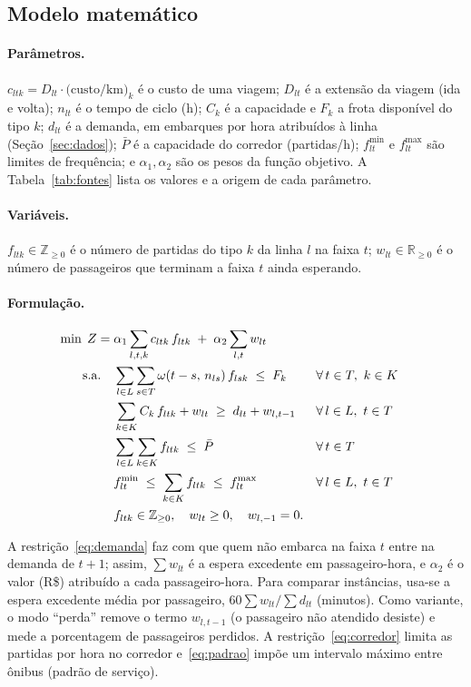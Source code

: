 \documentclass[11pt,a4paper]{article}
\newcommand{\R}{\mathbb{R}}
\begin{document}
\subsection{Modelo matemático}

\paragraph{Parâmetros.}
$c_{ltk}=D_{lt}\cdot\text{(custo/km)}_k$ é o custo de uma viagem; $D_{lt}$ é a
extensão da viagem (ida e volta); $n_{lt}$ é o tempo de ciclo (h); $C_k$ é a
capacidade e $F_k$ a frota disponível do tipo $k$; $d_{lt}$ é a demanda, em
embarques por hora atribuídos à linha (Seção~\ref{sec:dados}); $\bar{P}$ é a
capacidade do corredor (partidas/h); $f^{\min}_{lt}$ e $f^{\max}_{lt}$ são
limites de frequência; e $\alpha_1,\alpha_2$ são os pesos da função objetivo. A
Tabela~\ref{tab:fontes} lista os valores e a origem de cada parâmetro.

\paragraph{Variáveis.}
$f_{ltk}\in\mathbb{Z}_{\ge 0}$ é o número de partidas do tipo $k$ da linha $l$ na
faixa $t$; $w_{lt}\in\R_{\ge 0}$ é o número de passageiros que terminam a faixa
$t$ ainda esperando.

\paragraph{Formulação.}
\begin{align}
\min\; Z = {} & \alpha_1 \sum_{l,t,k} c_{ltk}\, f_{ltk} \;+\; \alpha_2 \sum_{l,t} w_{lt} \label{eq:fo}\\
\text{s.a.}\quad
& \sum_{l\in L}\sum_{s\in T} \omega\!\left(t-s,\, n_{ls}\right) f_{lsk} \;\le\; F_k
  && \forall\, t\in T,\ k\in K \label{eq:frota}\\
& \sum_{k\in K} C_k\, f_{ltk} + w_{lt} \;\ge\; d_{lt} + w_{l,t-1}
  && \forall\, l\in L,\ t\in T \label{eq:demanda}\\
& \sum_{l\in L}\sum_{k\in K} f_{ltk} \;\le\; \bar{P}
  && \forall\, t\in T \label{eq:corredor}\\
& f^{\min}_{lt} \;\le\; \sum_{k\in K} f_{ltk} \;\le\; f^{\max}_{lt}
  && \forall\, l\in L,\ t\in T \label{eq:padrao}\\
& f_{ltk}\in\mathbb{Z}_{\ge0},\quad w_{lt}\ge 0,\quad w_{l,-1}=0. \notag
\end{align}

A restrição~\eqref{eq:demanda} faz com que quem não embarca na faixa $t$ entre na
demanda de $t+1$; assim, $\sum w_{lt}$ é a espera excedente em
passageiro-hora, e $\alpha_2$ é o valor (R\$) atribuído a cada passageiro-hora.
Para comparar instâncias, usa-se a espera excedente média por passageiro,
$60\sum w_{lt}/\sum d_{lt}$ (minutos). Como variante, o modo ``perda'' remove o
termo $w_{l,t-1}$ (o passageiro não atendido desiste) e mede a porcentagem de
passageiros perdidos. A restrição~\eqref{eq:corredor} limita as partidas por
hora no corredor e~\eqref{eq:padrao} impõe um intervalo máximo entre ônibus
(padrão de serviço).
\end{document}
